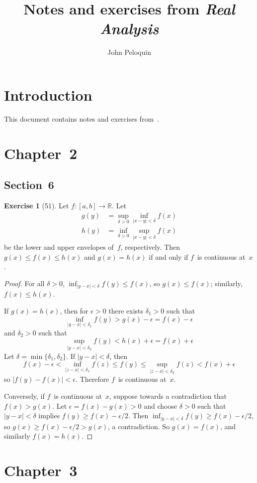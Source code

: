 \documentclass[letterpaper,12pt]{article}
\title{Notes and exercises from \textit{Real Analysis}}
\author{John Peloquin}
\date{}
\newcommand{\R}{\mathbb{R}}
\newcommand{\abs}[1]{|{#1}|}
\theoremstyle{plain}
\theoremstyle{definition}
\newtheorem*{exer}{Exercise}
\theoremstyle{remark}
\begin{document}
\maketitle

\section*{Introduction}
This document contains notes and exercises from~\cite{royden}.

\section*{Chapter~2}
\subsection*{Section~6}
\begin{exer}[51]
Let \(f:[a,b]\to\R\). Let
\begin{align*}
g(y)&=\sup_{\delta>0}\inf_{\abs{x-y}<\delta}f(x)\\
h(y)&=\inf_{\delta>0}\sup_{\abs{x-y}<\delta}f(x)
\end{align*}
be the lower and upper envelopes of~\(f\), respectively. Then \(g(x)\le f(x)\le h(x)\) and \(g(x)=h(x)\) if and only if \(f\)~is continuous at~\(x\).
\end{exer}
\begin{proof}
For all \(\delta>0\), \(\inf_{\abs{y-x}<\delta}f(y)\le f(x)\), so \(g(x)\le f(x)\); similarly, \(f(x)\le h(x)\).

If \(g(x)=h(x)\), then for \(\epsilon>0\) there exists \(\delta_1>0\) such that
\[\inf_{\abs{y-x}<\delta_1}f(y)>g(x)-\epsilon=f(x)-\epsilon\]
and \(\delta_2>0\) such that
\[\sup_{\abs{y-x}<\delta_2}f(y)<h(x)+\epsilon=f(x)+\epsilon\]
Let \(\delta=\min\{\delta_1,\delta_2\}\). If \(\abs{y-x}<\delta\), then
\[f(x)-\epsilon<\inf_{\abs{z-x}<\delta_1}f(z)\le f(y)\le\sup_{\abs{z-x}<\delta_2}f(z)<f(x)+\epsilon\]
so \(\abs{f(y)-f(x)}<\epsilon\). Therefore \(f\)~is continuous at~\(x\).

Conversely, if \(f\)~is continuous at~\(x\), suppose towards a contradiction that \(f(x)>g(x)\). Let \(\epsilon=f(x)-g(x)>0\) and choose \(\delta>0\) such that \(\abs{y-x}<\delta\) implies \(f(y)\ge f(x)-\epsilon/2\). Then \(\inf_{\abs{y-x}<\delta}f(y)\ge f(x)-\epsilon/2\), so \(g(x)\ge f(x)-\epsilon/2>g(x)\), a contradiction. So \(g(x)=f(x)\), and similarly \(f(x)=h(x)\).
\end{proof}

\section*{Chapter~3}
\end{document}

